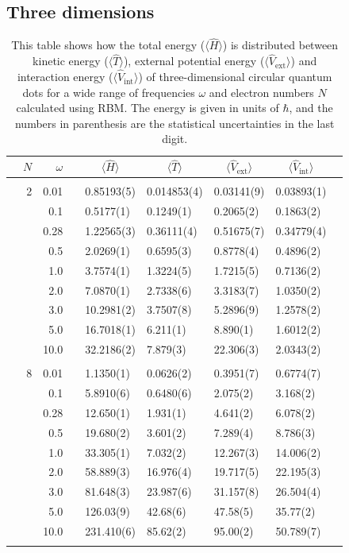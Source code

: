 \subsection{Three dimensions}
\begin{table}[H]
	\caption{This table shows how the total energy ($\langle\hat{H}\rangle$) is distributed between kinetic energy ($\langle\hat{T}\rangle$), external potential energy ($\langle\hat{V}_{\text{ext}}\rangle$) and interaction energy ($\langle\hat{V}_{\text{int}}\rangle$) of three-dimensional circular quantum dots for a wide range of frequencies $\omega$ and electron numbers $N$ calculated using RBM. The energy is given in units of $\hbar$, and the numbers in parenthesis are the statistical uncertainties in the last digit.}
	\label{tab:splitfrequencyQDRBM3D}
	\begin{tabularx}{\textwidth}{R{1cm}rrcR{2.3cm}R{2.3cm}R{2.3cm}R{2.3cm}R{1cm}} \hline\hline
		\makecell{\\ \phantom{$N$}} & $N$ & $\omega$ &&  &  &  &  & \\ \hline \\
		&2 & 0.01 && 0.85193(5) & 0.014853(4) & 0.03141(9) & 0.03893(1) \\
		&& 0.1 && 0.5177(1) & 0.1249(1) & 0.2065(2) & 0.1863(2) \\
		&& 0.28 && 1.22565(3) & 0.36111(4) & 0.51675(7) & 0.34779(4) \\
		&& 0.5 && 2.0269(1) & 0.6595(3) & 0.8778(4) & 0.4896(2) \\
		&& 1.0 && 3.7574(1) & 1.3224(5) & 1.7215(5) & 0.7136(2) \\
		&& 2.0 && 7.0870(1) & 2.7338(6) & 3.3183(7) & 1.0350(2) \\
		&& 3.0 && 10.2981(2) & 3.7507(8) & 5.2896(9) & 1.2578(2) \\ 
		&& 5.0 && 16.7018(1) & 6.211(1) & 8.890(1) & 1.6012(2) \\
		&& 10.0 && 32.2186(2) & 7.879(3) & 22.306(3) & 2.0343(2) \\
		\hdashline \\
		
		&8 & 0.01 && 1.1350(1) & 0.0626(2) & 0.3951(7) & 0.6774(7) \\
		&& 0.1 && 5.8910(6) & 0.6480(6) & 2.075(2) & 3.168(2) \\
		&& 0.28 && 12.650(1) & 1.931(1) & 4.641(2) & 6.078(2) \\
		&& 0.5 && 19.680(2) & 3.601(2) & 7.289(4) & 8.786(3) \\
		&& 1.0 && 33.305(1) & 7.032(2) & 12.267(3) & 14.006(2) \\
		&& 2.0 && 58.889(3) & 16.976(4) & 19.717(5) & 22.195(3) \\
		&& 3.0 && 81.648(3) & 23.987(6) & 31.157(8) & 26.504(4) \\ 
		&& 5.0 && 126.03(9) & 42.68(6) & 47.58(5) & 35.77(2) \\
		&& 10.0 && 231.410(6) & 85.62(2) & 95.00(2) & 50.789(7) \\
		\hdashline \\
		

\end{tabularx}
\end{table}
